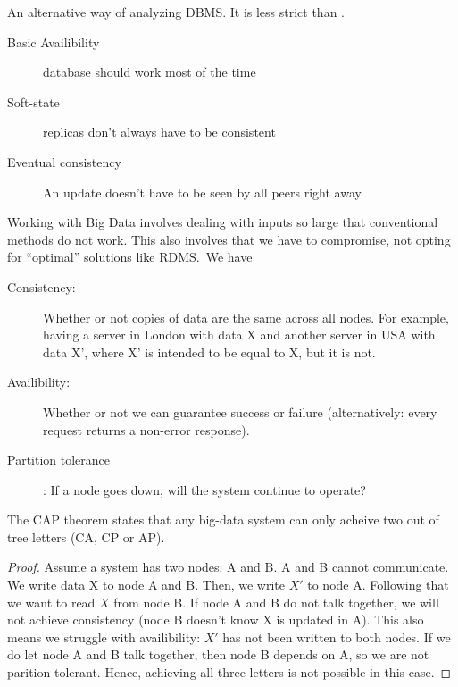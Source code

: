 \begin{definition}[BASE]\label{def:base}
    An alternative way of analyzing DBMS. It is less strict than .
    \begin{description}
        \item[Basic Availibility] database should work most of the time
        \item[Soft-state] replicas don't always have to be consistent
        \item[Eventual consistency] An update doesn't have to be seen by all peers right away
    \end{description}
\end{definition}

\begin{definition}\label{def:captheorem}
    Working with Big Data involves dealing with inputs so large that conventional methods do not work.
    This also involves that we have to compromise, not opting for ``optimal'' solutions like RDMS.\
    We have 
    \begin{description}
        \item[Consistency:] Whether or not copies of data are the same across all nodes.
        For example, having a server in London with data X and another server in USA with data X', where X' is intended to be equal to X, but it is not.
        \item[Availibility:] Whether or not we can guarantee success or failure (alternatively: every request returns a non-error response).
        \item[Partition tolerance]:  If a node goes down, will the system continue to operate?
    \end{description}

    The CAP theorem states that any big-data system can only acheive two out of tree letters (CA, CP or AP).
\end{definition}

\begin{proof}
Assume a system has two nodes: A and B. A and B cannot communicate.
We write data X to node A and B. Then, we write $X'$ to node A. Following that we want to read $X$ from node B.
If node A and B do not talk together, we will not achieve consistency (node B doesn't know X is updated in A).
This also means we struggle with availibility: $X'$ has not been written to both nodes.
If we do let node A and B talk together, then node B depends on A, so we are not parition tolerant.
Hence, achieving all three letters is not possible in this case.
\end{proof}


